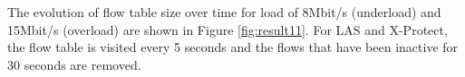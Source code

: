 \documentclass[preprint,12pt]{elsarticle}
\begin{document}


The evolution of  flow table size over time for load of 8Mbit/s (underload) and 15Mbit/s (overload) are shown in Figure \ref{fig:result11}. For LAS and X-Protect, the flow table is visited  every 5 seconds  and the flows that have been inactive for 30 seconds are removed. %
\end{document}
